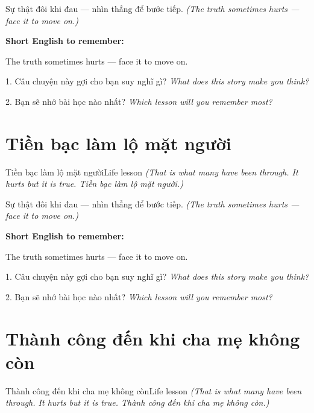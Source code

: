 \begin{baihoc}
Sự thật đôi khi đau — nhìn thẳng để bước tiếp.
\textit{(The truth sometimes hurts — face it to move on.)}
\end{baihoc}

\begin{ghinhoanh}
\textbf{Short English to remember:}

The truth sometimes hurts — face it to move on.

\end{ghinhoanh}

\begin{tuhocnhanh}
1. Câu chuyện này gợi cho bạn suy nghĩ gì? \textit{What does this story make you think?}

2. Bạn sẽ nhớ bài học nào nhất? \textit{Which lesson will you remember most?}
\end{tuhocnhanh}
\ngancach


\section{Tiền bạc làm lộ mặt người}
\begin{truyen}{Tiền bạc làm lộ mặt người}{Life lesson}
\textit{(That is what many have been through. It hurts but it is true. Tiền bạc làm lộ mặt người.)}
\end{truyen}

\begin{baihoc}
Sự thật đôi khi đau — nhìn thẳng để bước tiếp.
\textit{(The truth sometimes hurts — face it to move on.)}
\end{baihoc}

\begin{ghinhoanh}
\textbf{Short English to remember:}

The truth sometimes hurts — face it to move on.

\end{ghinhoanh}

\begin{tuhocnhanh}
1. Câu chuyện này gợi cho bạn suy nghĩ gì? \textit{What does this story make you think?}

2. Bạn sẽ nhớ bài học nào nhất? \textit{Which lesson will you remember most?}
\end{tuhocnhanh}
\ngancach


\section{Thành công đến khi cha mẹ không còn}
\begin{truyen}{Thành công đến khi cha mẹ không còn}{Life lesson}
\textit{(That is what many have been through. It hurts but it is true. Thành công đến khi cha mẹ không còn.)}
\end{truyen}

